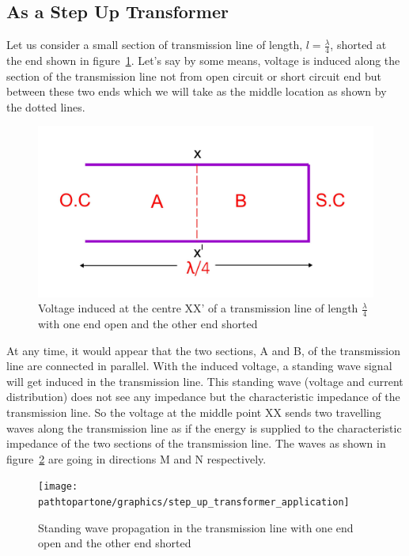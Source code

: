 \subsection{As a Step Up Transformer}
Let us consider a small section of transmission line of length, $l = \frac{\lambda}{4}$, shorted at the end shown in figure~\ref{fig:fig5}. Let's say by some means, voltage is induced along the section of the transmission line not from open circuit or short circuit end but between these two ends which we will take as the middle location as shown by the dotted lines.
\begin{figure}[h]
\centering
\includegraphics[width=1\linewidth]{./graphics/fig5}
\caption{Voltage induced at the centre XX' of a transmission line of length $\frac{\lambda}{4}$ with one end open and the other end shorted}
\label{fig:fig5}
\end{figure}

 At any time, it would appear that the two sections, A and B, of the transmission line are connected in parallel. With the induced voltage, a standing wave signal will get induced in the transmission line. This standing wave (voltage and current distribution) does not see any impedance but the characteristic impedance of the transmission line. So the voltage at the middle point XX sends two travelling waves along the transmission line as if the energy is supplied to the characteristic impedance of the two sections of the transmission line. The waves as shown in figure~\ref{fig:fig6} are going in directions M and N respectively.
 \begin{figure}[h]
\centering
\texttt{[image: \\pathtopartone/graphics/step\_up\_transformer\_application]}
\caption{Standing wave propagation in the transmission line with one end open and the other end shorted}
\label{fig:fig6}
\end{figure}

